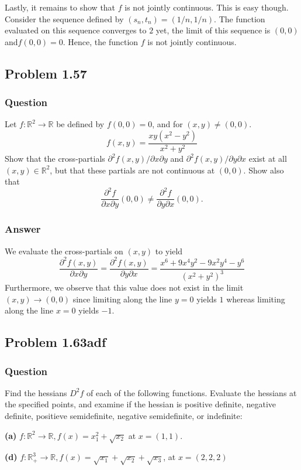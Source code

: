 \documentclass[12pt]{article}
\begin{document}
Lastly, it remains to show that $f$ is not jointly continuous. This is easy though. Consider the sequence defined by $(s_n,t_n)= (1/n,1/n)$. The function evaluated on this sequence converges to $2$ yet, the limit of this sequence is $(0,0)$ and$f(0,0)=0$. Hence, the function $f$ is not jointly continuous.
 
\subsection{Problem 1.57}
\subsubsection{Question}
Let $f: \mathbb{R}^2 \to \mathbb{R}$ be defined by $f(0,0)=0$, and for $(x,y) \neq (0,0)$.
\[f(x,y)=\frac{x y (x^2-y^2)}{x^2+y^2}\]
Show that the cross-partials $\partial^2f(x,y)/\partial x\partial y$ and $\partial^2f(x,y)/\partial y \partial x$ exist at all $(x,y) \in \mathbb{R}^2$, but that these partials are not continuous at $(0,0)$. Show also that
\[\frac{\partial^2 f}{\partial x \partial y} (0,0) \neq \frac{\partial^2 f}{\partial y \partial x} (0,0).\]
\subsubsection{Answer}
We evaluate the cross-partials on $(x,y)$ to yield
\[ \frac{\partial^2f(x,y)}{\partial x\partial y} = \frac{\partial^2f(x,y)}{\partial y \partial x} = \frac{x^6+9 x^4 y^2-9 x^2 y^4-y^6}{\left(x^2+y^2\right)^3} \]
Furthermore, we observe that this value does not exist in the limit $(x,y) \to (0,0)$ since limiting along the line $y=0$ yields $1$ whereas limiting along the line $x=0$ yields $-1$.

\subsection{Problem 1.63adf}
\subsubsection{Question}
Find the hessians $D^2 f$ of each of the following functions. Evaluate the hessians at the specified points, and examine if the hessian is positive definite, negative definite, positieve semidefinite, negative semidefinite, or indefinite: 

\textbf{(a)} $f:\mathbb{R}^2 \to \mathbb{R}, f(x) = x_1^2 + \sqrt{x_2}$ at $x = (1,1)$.

\textbf{(d)} $f:\mathbb{R}^3_+ \to \mathbb{R}, f(x) = \sqrt{x_1}+\sqrt{x_2}+\sqrt{x_3}$, at $x=(2,2,2)$
\end{document}
